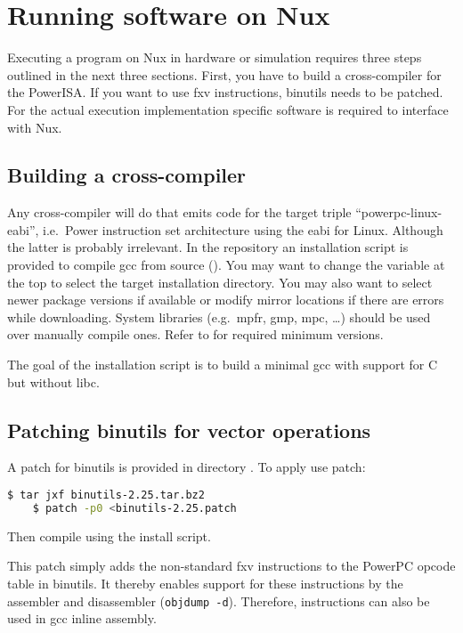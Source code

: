\chapter{Running software on Nux}
\label{ch:usesw}

Executing a program on Nux in hardware or simulation requires three steps outlined in the next three sections.
First, you have to build a cross-compiler for the PowerISA.
If you want to use \gls{fxv} instructions, binutils needs to be patched.
For the actual execution implementation specific software is required to interface with Nux.


\section{Building a cross-compiler}
Any cross-compiler will do that emits code for the target triple ``powerpc-linux-eabi'', i.e.\ Power instruction set architecture using the \gls{eabi} \citep{IBM1998} for Linux.
Although the latter is probably irrelevant.
In the repository an installation script is provided to compile gcc from source ().
You may want to change the  variable at the top to select the target installation directory.
You may also want to select newer package versions if available or modify mirror locations if there are errors while downloading.
System libraries (e.g.\ mpfr, gmp, mpc, \ldots) should be used over manually compile ones.
Refer to \cite{installgcc} for required minimum versions.

The goal of the installation script is to build a minimal gcc with support for C but without libc.


\section{Patching binutils for vector operations}

A patch for binutils is provided in directory .
To apply use patch:
\begin{lstlisting}[language=bash]
    $ tar jxf binutils-2.25.tar.bz2
    $ patch -p0 <binutils-2.25.patch
\end{lstlisting}
Then compile using the install script.

This patch simply adds the non-standard \gls{fxv} instructions to the PowerPC opcode table in binutils.
It thereby enables support for these instructions by the assembler and disassembler (\texttt{objdump -d}).
Therefore, instructions can also be used in gcc inline assembly.


